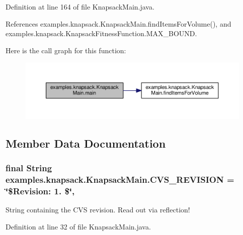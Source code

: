 Definition at line 164 of file Knapsack\-Main.\-java.



References examples.\-knapsack.\-Knapsack\-Main.\-find\-Items\-For\-Volume(), and examples.\-knapsack.\-Knapsack\-Fitness\-Function.\-M\-A\-X\-\_\-\-B\-O\-U\-N\-D.



Here is the call graph for this function\-:
\nopagebreak
\begin{figure}[H]
\begin{center}
\leavevmode
\includegraphics[width=350pt]{classexamples_1_1knapsack_1_1_knapsack_main_a5f52e75b5dbf4cd975197166cba7d5b0_cgraph}
\end{center}
\end{figure}




\subsection{Member Data Documentation}
\hypertarget{classexamples_1_1knapsack_1_1_knapsack_main_ac34751b27a917d91386fb15f825b4c3c}{
\subsubsection[{C\-V\-S\-\_\-\-R\-E\-V\-I\-S\-I\-O\-N}]{\setlength{\rightskip}{0pt plus 5cm}final String examples.\-knapsack.\-Knapsack\-Main.\-C\-V\-S\-\_\-\-R\-E\-V\-I\-S\-I\-O\-N = \char`\"{}\$Revision\-: 1. \$\char`\"{}\hspace{0.3cm}{\ttfamily [static]}, {\ttfamily [private]}}}\label{classexamples_1_1knapsack_1_1_knapsack_main_ac34751b27a917d91386fb15f825b4c3c}
String containing the C\-V\-S revision. Read out via reflection! 

Definition at line 32 of file Knapsack\-Main.\-java.

